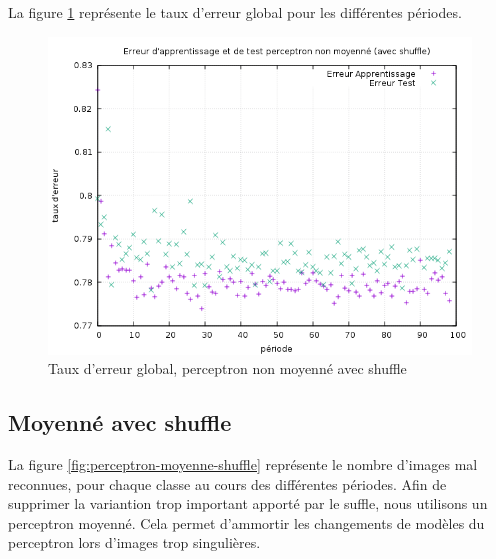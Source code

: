 La figure \ref{fig:erreur-perceptron-non-moyenne-shuffle} représente le taux d'erreur global pour les différentes périodes.

\begin{figure}[H]
\begin{center}

\includegraphics[width=\textwidth]{images/erreur_Perceptron_multiclasse_non_moyenne_shuffle.png}
\caption{Taux d'erreur global, perceptron non moyenné avec shuffle}
\label{fig:erreur-perceptron-non-moyenne-shuffle}
\end{center}
\end{figure}

\subsection{Moyenné avec shuffle}

La figure \ref{fig:perceptron-moyenne-shuffle} représente le nombre d'images mal reconnues, pour chaque classe au cours des différentes périodes.
Afin de supprimer la variantion trop important apporté par le suffle, nous utilisons un perceptron moyenné. Cela permet d'ammortir les changements de modèles du perceptron lors d'images trop singulières.


